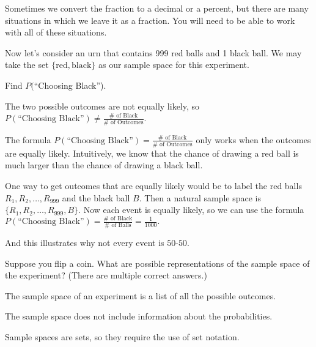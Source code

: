 \documentclass{ximera}
\begin{document}
Sometimes we convert the fraction to a decimal or a percent, but there are many situations in which we leave it as a fraction. You will need to be able to work with all of these situations.

Now let's consider an urn that contains 999 red balls and 1 black ball. We may take the set $\{ \text{red}, \text{black} \}$ as our sample space for this experiment. 

\begin{question}
Find $P($``Choosing Black'').

    \begin{multipleChoice}
      \end{multipleChoice}
    \begin{hint}
    The two possible outcomes are not equally likely, so $P(\text{``Choosing Black''})\ne\frac{\#\text{ of Black}}{\#\text{ of Outcomes}}$.
    \end{hint}

\end{question}

The formula $P(\text{``Choosing Black''})=\frac{\#\text{ of Black}}{\#\text{ of Outcomes}}$ only works when the outcomes are equally likely. 
Intuitively, we know that the chance of drawing a red ball is much larger than the chance of drawing a black ball. 

One way to get outcomes that are equally likely would be to label the red balls $R_1,R_2,\ldots, R_{999}$ and the black ball $B$. Then a natural sample space is $\{R_1,R_2,\ldots,R_{999},B\}$. Now each event is equally likely, so we can use the formula 
$
P(\text{``Choosing Black''})=\frac{\#\text{ of Black}}{\#\text{ of Balls}}=\frac{1}{1000}.
$

And this illustrates why not every event is $50$-$50$.


\begin{question}
Suppose you flip a coin. What are possible representations of the sample space of the experiment? (There are multiple correct answers.)

    \begin{multipleChoice}
      \end{multipleChoice}
    \begin{hint}
    The sample space of an experiment is a list of all the possible outcomes.
    \end{hint}
    \begin{hint}
    The sample space does not include information about the probabilities.
    \end{hint}
    \begin{hint}
    Sample spaces are sets, so they require the use of set notation.
    \end{hint}

\end{question}
\end{document}
